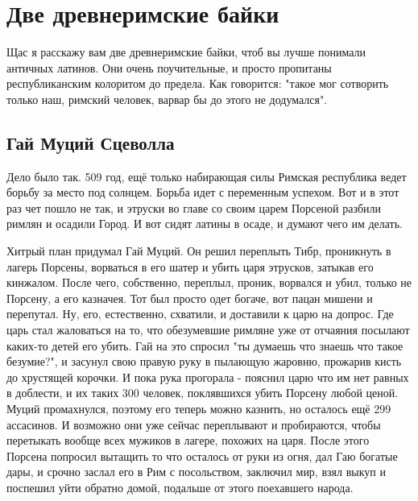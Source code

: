 \chapter{Две древнеримские байки}

Щас я расскажу вам две древнеримские байки, чтоб вы лучше понимали античных латинов. Они очень поучительные, и просто пропитаны республиканским колоритом до предела. Как говорится: "такое мог сотворить только наш, римский человек, варвар бы до этого не додумался".
\section{Гай Муций Сцеволла}

Дело было так. 509 год, ещё только набирающая силы Римская республика ведет борьбу за место под солнцем. Борьба идет с переменным успехом. Вот и в этот раз чет пошло не так, и этруски во главе со своим царем Порсеной разбили римлян и осадили Город. И вот сидят латины в осаде, и думают чего им делать.


Хитрый план придумал Гай Муций. Он решил переплыть Тибр, проникнуть в лагерь Порсены, ворваться в его шатер и убить царя этрусков, затыкав его кинжалом. После чего, собственно, переплыл, проник, ворвался и убил, только не Порсену, а его казначея. Тот был просто одет богаче, вот пацан мишени и перепутал. Ну, его, естественно, схватили, и доставили к царю на допрос. Где царь стал жаловаться на то, что обезумевшие римляне уже от отчаяния посылают каких-то детей его убить. Гай на это спросил "ты думаешь что знаешь что такое безумие?", и засунул свою правую руку в пылающую жаровню, прожарив кисть до хрустящей корочки. И пока рука прогорала - пояснил царю что им нет равных в доблести, и их таких 300 человек, поклявшихся убить Порсену любой ценой. Муций промахнулся, поэтому его теперь можно казнить, но осталось ещё 299 ассасинов. И возможно они уже сейчас переплывают и пробираются, чтобы перетыкать вообще всех мужиков в лагере, похожих на царя. После этого Порсена попросил вытащить то что осталось от руки из огня, дал Гаю богатые дары, и срочно заслал его в Рим с посольством, заключил мир, взял выкуп и поспешил уйти обратно домой, подальше от этого поехавшего народа.


